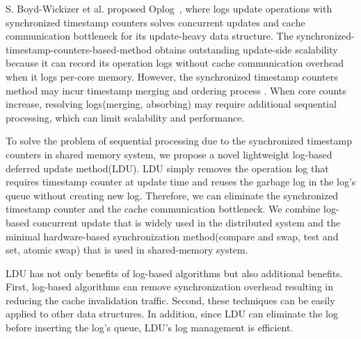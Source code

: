 S. Boyd-Wickizer et al. proposed Oplog~\cite{SilasBoydWickizerPth}, where logs
update operations with synchronized timestamp counters solves concurrent
updates and cache communication bottleneck for its update-heavy data structure.
The synchronized-timestamp-counters-based-method obtains outstanding
update-side scalability because it can record its operation logs without
cache communication overhead when it logs per-core memory.
However, the synchronized timestamp counters method may incur timestamp merging
and ordering process .
When core counts increase, resolving logs(merging, absorbing) may require
additional sequential processing, which can limit scalability and performance.

%
To solve the problem of sequential processing due to the synchronized timestamp
counters in shared memory system, we propose a novel lightweight log-based
deferred update method(LDU).
LDU simply removes the operation log that requires timestamp counter at
update time and reuses the garbage log in the log's queue without creating new
log.
Therefore, we can eliminate the synchronized timestamp counter and the cache
communication bottleneck.
We combine log-based concurrent update that is widely used in
the distributed system and the minimal hardware-based synchronization
method(compare and swap, test and set, atomic swap) that is used in shared-memory system.

LDU has not only benefits of log-based algorithms but also additional benefits.
First, log-based algorithms can remove synchronization overhead resulting in
reducing the cache invalidation traffic.
Second, these techniques can be easily applied to other data structures.
In addition, since LDU can eliminate the log before inserting the log's queue,
LDU's log management is efficient.


